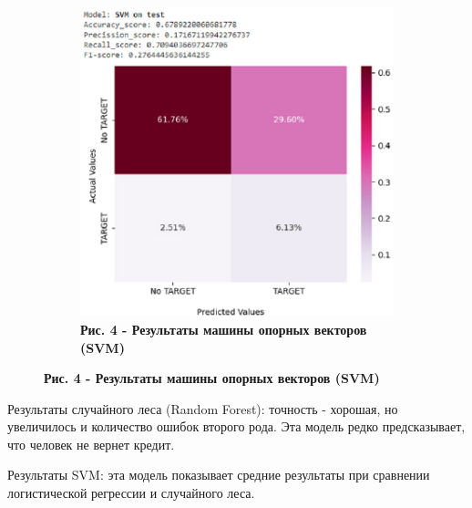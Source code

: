 \begin{figure}[H]
\begin{subfigure}[b]{0.45\textwidth}
			\includegraphics[width=\textwidth]{assets/122}
			\caption*{\bfseries Рис. 4 - Результаты машины опорных векторов (SVM)}
		\end{subfigure}
		
	\end{figure}


\begin{multicols}{2}


	Результаты случайного леса (Random Forest): точность - хорошая, но
	увеличилось и количество ошибок второго рода. Эта модель редко
	предсказывает, что человек не вернет кредит.
	
	
	Результаты SVM: эта модель показывает средние результаты при сравнении
	логистической регрессии и случайного леса.
\end{multicols}




